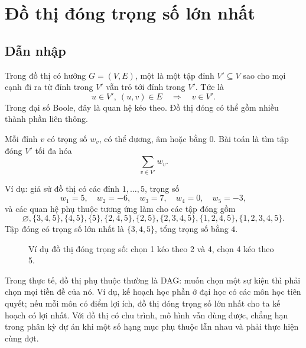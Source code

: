 \documentclass[11pt]{article}
\begin{document}
\section{Đồ thị đóng trọng số lớn nhất}

\subsection{Dẫn nhập}

Trong đồ thị có hướng \(G=(V,E)\), một  là một tập đỉnh
\(V'\subseteq V\) sao cho mọi cạnh đi ra từ đỉnh trong \(V'\) vẫn trỏ tới
đỉnh trong \(V'\). Tức là
\[
  u\in V',\ (u,v)\in E \quad\Rightarrow\quad v\in V'.
\]
Trong đại số Boole, đây là quan hệ kéo theo. Đồ thị đóng có thể gồm nhiều
thành phần liên thông.

Mỗi đỉnh \(v\) có trọng số \(w_v\), có thể dương, âm hoặc bằng \(0\). Bài toán
 là tìm tập đóng \(V'\) tối đa hóa
\[
  \sum_{v\in V'} w_v.
\]

Ví dụ: giả sử đồ thị có các đỉnh \(1,\ldots,5\), trọng số
\[
  w_1=5,\quad w_2=-6,\quad w_3=7,\quad w_4=0,\quad w_5=-3,
\]
và các quan hệ phụ thuộc tương ứng làm cho các tập đóng gồm
\[
\varnothing,\{3,4,5\},\{4,5\},\{5\},\{2,4,5\},\{2,5\},
\{2,3,4,5\},\{1,2,4,5\},\{1,2,3,4,5\}.
\]
Tập đóng có trọng số lớn nhất là \(\{3,4,5\}\), tổng trọng số bằng \(4\).

\begin{figure}[htbp]
\centering
{}
\caption{Ví dụ đồ thị đóng trọng số: chọn 1 kéo theo 2 và 4, chọn 4 kéo theo 5.}
\end{figure}

Trong thực tế, đồ thị phụ thuộc thường là DAG: muốn chọn một sự kiện thì phải
chọn mọi tiền đề của nó. Ví dụ, kế hoạch học phần ở đại học có các môn học
tiên quyết; nếu mỗi môn có điểm lợi ích, đồ thị đóng trọng số lớn nhất cho
ta kế hoạch có lợi nhất. Với đồ thị có chu trình, mô hình vẫn dùng được, chẳng
hạn trong phân kỳ dự án khi một số hạng mục phụ thuộc lẫn nhau và phải thực
hiện cùng đợt.
\end{document}
